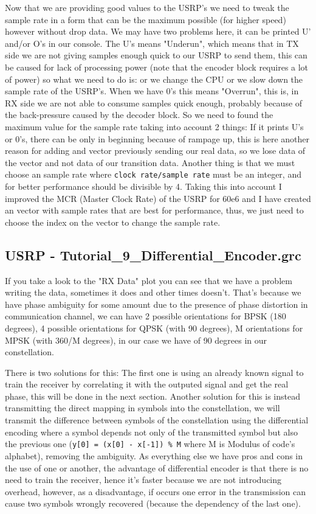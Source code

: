\documentclass[a4paper, 10pt, conference]{ieeeconf}      %
\begin{document}
    Now that we are providing good values to the USRP's we need to tweak the sample rate in a form that can be the maximum possible (for higher speed) however without drop data. We may have two problems here, it can be printed U' and/or O's in our console. The U's means "Underun", which means that in TX side we are not giving samples enough quick to our USRP to send them, this can be caused for lack of processing power (note that the encoder block requires a lot of power) so what we need to do is: or we change the CPU or we slow down the sample rate of the USRP's. When we have 0's this means "Overrun", this is, in RX side we are not able to consume samples quick enough, probably because of the back-pressure caused by the decoder block. So we need to found the maximum value for the sample rate taking into account 2 things: If it prints U's or 0's, there can be only in beginning because of rampage up, this is here another reason for adding and vector previously sending our real data, so we lose data of the vector and not data of our transition data. Another thing is that we must choose an sample rate where \verb|clock rate/sample rate| must be an integer, and for better performance should be divisible by 4.
    Taking this into account I improved the MCR (Master Clock Rate) of the USRP for 60e6 and I have created an vector with sample rates that are best for performance, thus, we just need to choose the index on the vector to change the sample rate.

\subsection{USRP - Tutorial\_9\_Differential\_Encoder.grc}
    If you take a look to the "RX Data" plot you can see that we have a problem writing the data, sometimes it does and other times doesn't. That's because we have phase ambiguity for some amount due to the presence of phase distortion in communication channel, we can have 2 possible orientations for BPSK (180 degrees), 4 possible orientations for QPSK (with 90 degrees), M orientations for MPSK (with 360/M degrees), in our case we have of 90 degrees in our constellation. 
    
    There is two solutions for this: The first one is using an already known signal to train the receiver by correlating it with the outputed signal and get the real phase, this will be done in the next section. Another solution for this is instead transmitting the direct mapping in symbols into the constellation, we will transmit the difference between symbols of the constellation using the differential encoding where a symbol depends not only of the transmitted symbol but also the previous one (\verb|y[0] = (x[0] - x[-1]) % M| where M is Modulus of code's alphabet), removing the ambiguity. As everything else we have pros and cons in the use of one or another, the advantage of differential encoder is that there is no need to train the receiver, hence it's faster because we are not introducing overhead, however, as a disadvantage, if occurs one error in the transmission can cause two symbols wrongly recovered (because the dependency of the last one).
    
\end{document}
